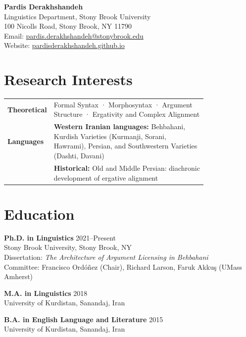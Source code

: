 \documentclass[a4paper,10pt]{article}
\begin{document}
\begin{center}
{\LARGE \textbf{Pardis Derakhshandeh}} \\
Linguistics Department, Stony Brook University \\
100 Nicolls Road, Stony Brook, NY 11790 \\
Email: \href{mailto:pardis.derakhshandeh@stonybrook.edu}{pardis.derakhshandeh@stonybrook.edu} \\
Website: \href{https://pardisderakhshandeh.github.io}{pardisderakhshandeh.github.io}
\end{center}

\section*{Research Interests}
\begin{tabular}{@{}l p{0.8\linewidth}@{}}
\textbf{Theoretical}  & Formal Syntax · Morphosyntax · Argument Structure · Ergativity and Complex Alignment \\
\textbf{Languages}  & \textbf{Western Iranian languages:} Behbahani, Kurdish Varieties (Kurmanji, Sorani, Hawrami), Persian, and Southwestern Varieties  (Dashti, Davani) \\
                   & \textbf{Historical:} Old and Middle Persian: diachronic development of ergative alignment \\
\end{tabular}

\section*{Education}
\textbf{Ph.D. in Linguistics} \hfill 2021--Present \\
Stony Brook University, Stony Brook, NY \\
Dissertation: \textit{The Architecture of Argument Licensing in Behbahani} \\
Committee: Francisco Ordóñez (Chair), Richard Larson, Faruk Akku\c{s} (UMass Amherst)\\

\vspace{4pt}

\textbf{M.A. in Linguistics} \hfill 2018 \\
University of Kurdistan, Sanandaj, Iran\\

\vspace{4pt}

\textbf{B.A. in English Language and Literature} \hfill 2015 \\
University of Kurdistan, Sanandaj, Iran\\
\end{document}
